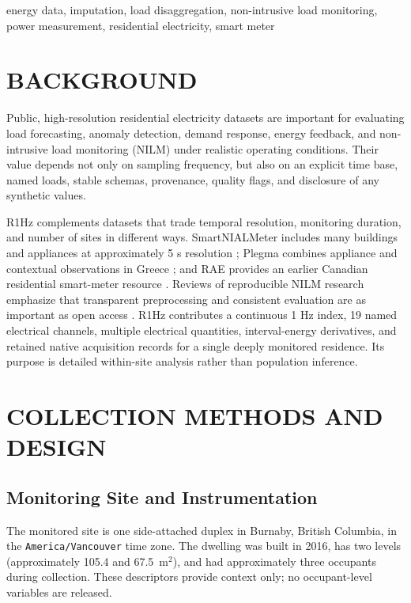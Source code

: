 \documentclass{IEEEoj-data}
\begin{document}
\begin{IEEEkeywords}
energy data, imputation, load disaggregation, non-intrusive load monitoring, power measurement, residential electricity, smart meter
\end{IEEEkeywords}

\maketitle

\section*{BACKGROUND}
Public, high-resolution residential electricity datasets are important for evaluating load forecasting, anomaly detection, demand response, energy feedback, and non-intrusive load monitoring (NILM) under realistic operating conditions. Their value depends not only on sampling frequency, but also on an explicit time base, named loads, stable schemas, provenance, quality flags, and disclosure of any synthetic values.

R1Hz complements datasets that trade temporal resolution, monitoring duration, and number of sites in different ways. SmartNIALMeter includes many buildings and appliances at approximately 5 s resolution \cite{1}; Plegma combines appliance and contextual observations in Greece \cite{2}; and RAE provides an earlier Canadian residential smart-meter resource \cite{5}. Reviews of reproducible NILM research emphasize that transparent preprocessing and consistent evaluation are as important as open access \cite{3}. R1Hz contributes a continuous 1 Hz index, 19 named electrical channels, multiple electrical quantities, interval-energy derivatives, and retained native acquisition records for a single deeply monitored residence. Its purpose is detailed within-site analysis rather than population inference.

\section*{COLLECTION METHODS AND DESIGN}

\subsection{Monitoring Site and Instrumentation}
The monitored site is one side-attached duplex in Burnaby, British Columbia, in the \texttt{America/Vancouver} time zone. The dwelling was built in 2016, has two levels (approximately 105.4 and 67.5~m$^2$), and had approximately three occupants during collection. These descriptors provide context only; no occupant-level variables are released.
\end{document}
